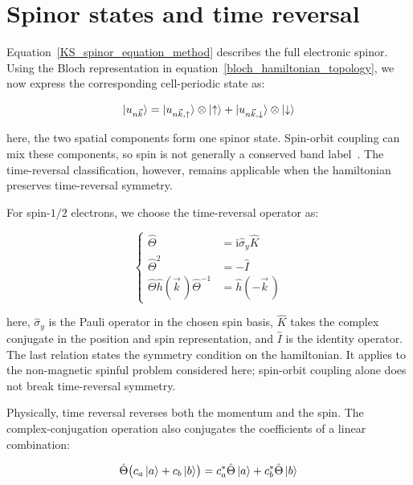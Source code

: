 \newpage
\section{Spinor states and time reversal}
\label{sec:spinors_time_reversal_appendix}

Equation~\eqref{KS_spinor_equation_method} describes the full electronic spinor.
Using the Bloch representation in equation~\eqref{bloch_hamiltonian_topology},
we now express the corresponding cell-periodic state as:

\begin{equation}
    \ket{u_{n\vec{k}}}
    =\ket{u_{n\vec{k},\uparrow}}\otimes\ket{\uparrow}
    +\ket{u_{n\vec{k},\downarrow}}\otimes\ket{\downarrow}
\label{cell_periodic_spinor_topology}
\end{equation}

here, the two spatial components form one spinor state.
Spin-orbit coupling can mix these components, so spin is not generally a conserved band label~\cite{bihlmayer2022rashba}.
The time-reversal classification, however, remains applicable when the hamiltonian preserves time-reversal symmetry.

For spin-$1/2$ electrons, we choose the time-reversal operator as:

\begin{equation}
\left\{\begin{aligned}
    \hat{\Theta}&=\mathrm{i}\hat{\sigma}_y\hat{K} \\
    \hat{\Theta}^2&=-\hat{I} \\
    \hat{\Theta}\hat{h}(\vec{k}\,)\hat{\Theta}^{-1}
    &=\hat{h}(-\vec{k}\,)
\end{aligned}\right.
\label{spinful_time_reversal_topology}
\end{equation}

here, $\hat{\sigma}_y$ is the Pauli operator in the chosen spin basis,
$\hat{K}$ takes the complex conjugate in the position and spin representation,
and $\hat{I}$ is the identity operator.
The last relation states the symmetry condition on the hamiltonian.
It applies to the non-magnetic spinful problem considered here;
spin-orbit coupling alone does not break time-reversal symmetry.

Physically, time reversal reverses both the momentum and the spin.
The complex-conjugation operation also conjugates the coefficients of a linear combination:

\begin{equation}
    \hat{\Theta}\bigl(c_a\ket{a}+c_b\ket{b}\bigr)
    =c_a^*\hat{\Theta}\ket{a}+c_b^*\hat{\Theta}\ket{b}
\label{time_reversal_antilinearity_topology}
\end{equation}

